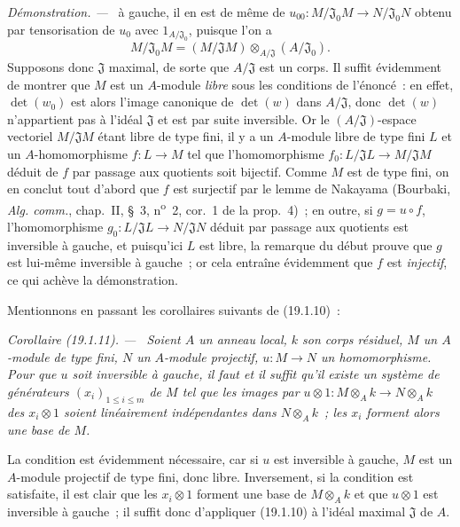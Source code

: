 \documentclass[10pt,oneside]{book}
\makeatletter
\newcommand{\setmanualcurrentlabel}[1]{\def\@currentlabel{#1}}
\newenvironment{corollary}[1][]{%
  \setmanualcurrentlabel{#1}\par\medskip\noindent\itshape Corollaire (#1). ---\ }{\par}
\newenvironment{proof}{%
  \par\medskip\noindent\textit{Démonstration. ---\ }}{\par}
\makeatother
\begin{document}
\begin{proof}
à gauche, il en est de même de
$u_{00}:M/\mathfrak J_0M\to N/\mathfrak J_0N$ obtenu par tensorisation de
$u_0$ avec $1_{A/\mathfrak J_0}$, puisque l'on a
\[
  M/\mathfrak J_0M=(M/\mathfrak JM)\otimes_{A/\mathfrak J}(A/\mathfrak J_0).
\]
Supposons donc $\mathfrak J$ maximal, de sorte que $A/\mathfrak J$ est un
corps. Il suffit évidemment de montrer que $M$ est un $A$-module \emph{libre}
sous les conditions de l'énoncé~: en effet, $\det(w_0)$ est alors l'image
canonique de $\det(w)$ dans $A/\mathfrak J$, donc $\det(w)$ n'appartient pas à
l'idéal $\mathfrak J$ et est par suite inversible. Or le
$(A/\mathfrak J)$-espace vectoriel $M/\mathfrak JM$ étant libre de type fini,
il y a un $A$-module libre de type fini $L$ et un $A$-homomorphisme $f:L\to M$ tel
que l'homomorphisme $f_0:L/\mathfrak JL\to M/\mathfrak JM$ déduit de $f$ par
passage aux quotients soit bijectif. Comme $M$ est de type fini, on en conclut
tout d'abord que $f$ est surjectif par le lemme de Nakayama (Bourbaki,
\emph{Alg. comm.}, chap.~II, §~3, n\textsuperscript{o}~2, cor.~1 de la
prop.~4)~; en outre, si $g=u\circ f$, l'homomorphisme
$g_0:L/\mathfrak JL\to N/\mathfrak JN$ déduit par passage aux quotients est
inversible à gauche, et puisqu'ici $L$ est libre, la remarque du début prouve
que $g$ est lui-même inversible à gauche~; or cela entraîne évidemment que
$f$ est \emph{injectif}, ce qui achève la démonstration.
\end{proof}

Mentionnons en passant les corollaires suivants de (19.1.10)~:

\begin{corollary}[19.1.11]
\label{0.19.1.11-fr}
Soient $A$ un anneau local, $k$ son corps résiduel, $M$ un $A$-module de type
fini, $N$ un $A$-module projectif, $u:M\to N$ un homomorphisme. Pour que $u$
soit inversible à gauche, il faut et il suffit qu'il existe un système de
générateurs $(x_i)_{1\leq i\leq m}$ de $M$ tel que les images par
$u\otimes 1:M\otimes_Ak\to N\otimes_Ak$ des $x_i\otimes1$ soient linéairement
indépendantes dans $N\otimes_Ak$~; les $x_i$ forment alors une base de $M$.
\end{corollary}

La condition est évidemment nécessaire, car si $u$ est inversible à gauche,
$M$ est un $A$-module projectif de type fini, donc libre. Inversement, si la
condition est satisfaite, il est clair que les $x_i\otimes1$ forment une base
de $M\otimes_Ak$ et que $u\otimes1$ est inversible à gauche~; il suffit donc
d'appliquer (19.1.10) à l'idéal maximal $\mathfrak J$ de $A$.
\end{document}
